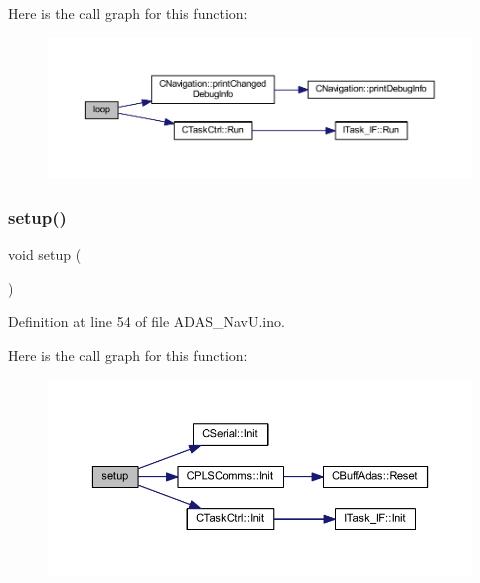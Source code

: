 Here is the call graph for this function\+:
\nopagebreak
\begin{figure}[H]
\begin{center}
\leavevmode
\includegraphics[width=350pt]{_a_d_a_s___nav_u_8ino_afe461d27b9c48d5921c00d521181f12f_cgraph}
\end{center}
\end{figure}
\mbox{\label{_a_d_a_s___nav_u_8ino_a4fc01d736fe50cf5b977f755b675f11d}} 
\subsubsection{\texorpdfstring{setup()}{setup()}}
{\footnotesize\ttfamily void setup (\begin{DoxyParamCaption}{ }\end{DoxyParamCaption})}



Definition at line 54 of file A\+D\+A\+S\+\_\+\+Nav\+U.\+ino.

Here is the call graph for this function\+:
\nopagebreak
\begin{figure}[H]
\begin{center}
\leavevmode
\includegraphics[width=350pt]{_a_d_a_s___nav_u_8ino_a4fc01d736fe50cf5b977f755b675f11d_cgraph}
\end{center}
\end{figure}


